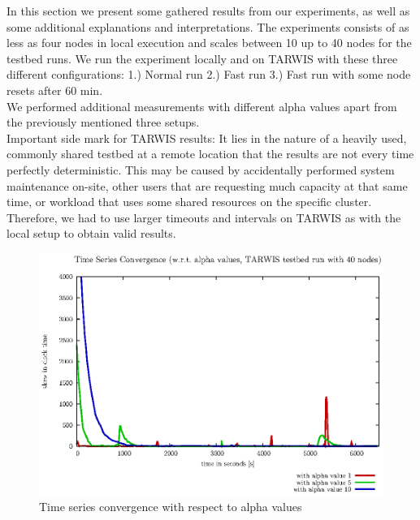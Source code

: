 \documentclass{llncs}
\begin{document}
In this section we present some gathered results from our experiments, as well as some additional explanations and interpretations. The experiments consists of as less as four nodes in local execution and scales between 10 up to 40 nodes for the testbed runs. We run the experiment locally and on TARWIS with these three different configurations: 1.) Normal run 2.) Fast run 3.) Fast run with some node resets after 60 min. \\
We performed additional measurements with different alpha values apart from the previously mentioned three setups.\\
Important side mark for TARWIS results: It lies in the nature of a heavily used, commonly shared testbed at a remote location that the results are not every time perfectly deterministic. This may be caused by accidentally performed system maintenance on-site, other users that are requesting much capacity at that same time, or workload that uses some shared resources on the specific cluster. Therefore, we had to use larger timeouts and intervals on TARWIS as with the local setup to obtain valid results.
\begin{figure}[H]
	\centering
	\includegraphics[scale=0.6]{images/FIG_01.eps}
	\caption{Time series convergence with respect to alpha values}
	\label{fig:alpha}
\end{figure}
\end{document}
